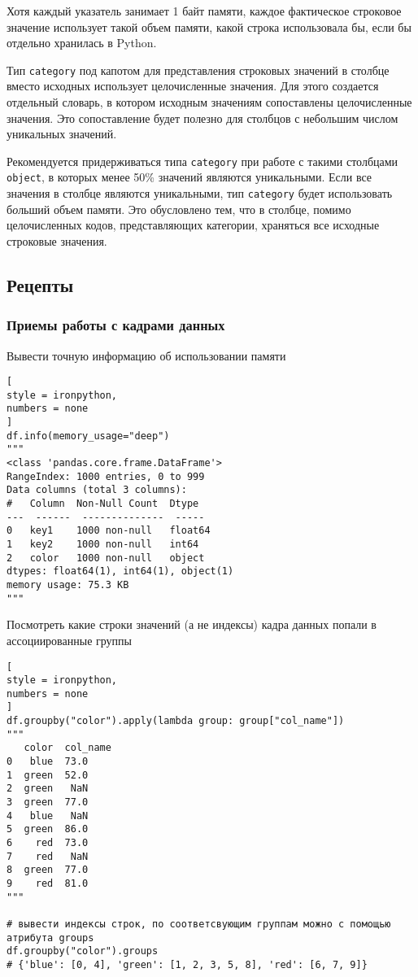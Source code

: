 \documentclass[%
	11pt,
	a4paper,
	utf8,
		]{article}
\begin{document}
Хотя каждый указатель занимает 1 байт памяти, каждое фактическое строковое значение использует такой объем памяти, какой строка использовала бы, если бы отдельно хранилась в Python.

Тип \texttt{category} под капотом для представления строковых значений в столбце вместо исходных использует целочисленные значения. Для этого создается отдельный словарь, в котором исходным значениям сопоставлены целочисленные значения. Это сопоставление будет полезно для столбцов с небольшим числом уникальных значений.

Рекомендуется придерживаться типа \texttt{category} при работе с такими столбцами \texttt{object}, в которых менее 50\% значений являются уникальными. Если все значения в столбце являются уникальными, тип \texttt{category} будет использовать б\emph{о}льший объем памяти. Это обусловлено тем, что в столбце, помимо целочисленных кодов, представляющих категории, храняться все исходные строковые значения.


\subsection{Рецепты}

\subsubsection{Приемы работы с кадрами данных}

Вывести точную информацию об использовании памяти
\begin{lstlisting}[
style = ironpython,
numbers = none	
]
df.info(memory_usage="deep")
"""
<class 'pandas.core.frame.DataFrame'>
RangeIndex: 1000 entries, 0 to 999
Data columns (total 3 columns):
#   Column  Non-Null Count  Dtype
---  ------  --------------  -----
0   key1    1000 non-null   float64
1   key2    1000 non-null   int64
2   color   1000 non-null   object
dtypes: float64(1), int64(1), object(1)
memory usage: 75.3 KB
"""
\end{lstlisting}

Посмотреть какие строки значений (а не индексы) кадра данных попали в ассоциированные группы
\begin{lstlisting}[
style = ironpython,
numbers = none
]
df.groupby("color").apply(lambda group: group["col_name"])
"""
   color  col_name
0   blue  73.0
1  green  52.0
2  green   NaN
3  green  77.0
4   blue   NaN
5  green  86.0
6    red  73.0
7    red   NaN
8  green  77.0
9    red  81.0
"""

# вывести индексы строк, по соответсвующим группам можно с помощью атрибута groups
df.groupby("color").groups
# {'blue': [0, 4], 'green': [1, 2, 3, 5, 8], 'red': [6, 7, 9]}
\end{lstlisting}
\end{document}
